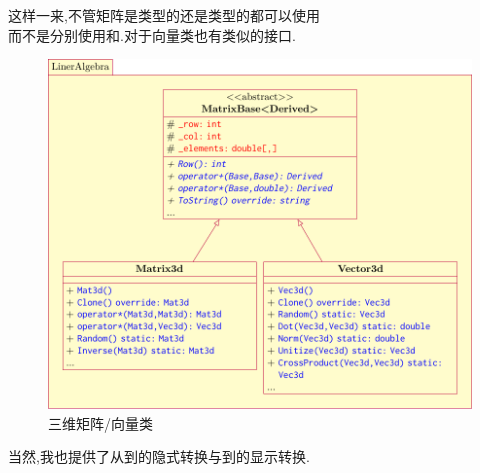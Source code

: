 \documentclass[10pt,a4paper]{ctexart}
\begin{document}
这样一来,不管矩阵是类型的还是类型的都可以使用\\而不是分别使用和.对于向量类也有类似的接口.
\begin{figure}[H]
\centering
\includegraphics[scale=0.9]{Figures/Matrix3dClass.pdf}
\caption{三维矩阵/向量类}
\label{fig:Matrix3dClass}
\end{figure}
\noindent 当然,我也提供了从到的隐式转换与到的显示转换.
\end{document}
